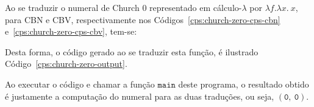 Ao se traduzir o numeral de Church 0 representado em cálculo-$\lambda$ por $\lambda f.\lambda x.\ x$, para CBN e CBV, respectivamente nos Códigos~\ref{cps:church-zero-cps-cbn} e~\ref{cps:church-zero-cps-cbv}, tem-se:


Desta forma, o código gerado ao se traduzir esta função, é ilustrado Código~\ref{cps:church-zero-output}.

Ao executar o código e chamar a função $\mathtt{main}$ deste programa, o resultado obtido é justamente a computação do numeral para as duas traduções, ou seja, $\mathtt{(0,\ 0)}$.

